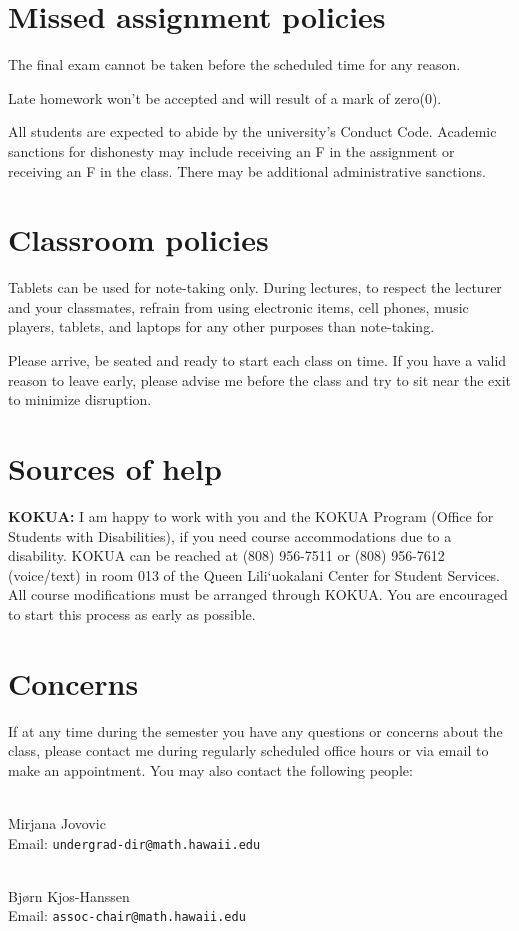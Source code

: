 \documentclass[12pt]{amsart}
\newcommand{\spacer}{\vspace{.2cm}}
\newcommand{\svs}{\vspace{.1cm}}
\begin{document}
\section*{Missed assignment policies}

 The final exam cannot be taken before the scheduled time for any reason.

 Late homework won't be accepted and will result of a mark of zero(0).
\svs

All students are expected to abide by the university's Conduct Code. Academic sanctions for dishonesty may include receiving an F in the assignment or receiving an F in the class. There may be additional administrative sanctions.

\section*{Classroom policies}
Tablets can be used for note-taking only. During lectures, to respect the lecturer and your classmates, refrain from using electronic items, cell phones, music players, tablets, and laptops for any other purposes than note-taking.

Please arrive, be seated and ready to start each class on time. If you have a valid reason to leave early, please advise me before the class and try to sit near the exit to minimize disruption.

\section*{Sources of help}
{\bf KOKUA:} I am happy to work with you and the KOKUA Program (Office for Students with Disabilities), if you need course accommodations due to a disability. KOKUA can be reached at (808) 956-7511 or (808) 956-7612 (voice/text) in room 013 of the Queen Lili`uokalani Center for Student Services. All course modifications must be arranged through KOKUA. You are encouraged to start this process as early as possible.

\section*{Concerns}
If at any time during the semester you have any questions or concerns about the class, please contact me during regularly scheduled office hours or via email to make an appointment. You may also contact the following people:
\spacer

\\
Mirjana Jovovic \\
Email: \texttt{undergrad-dir@math.hawaii.edu}

\svs
{}\\
Bj{\o}rn Kjos-Hanssen \\
Email: \texttt{assoc-chair@math.hawaii.edu}
\end{document}
